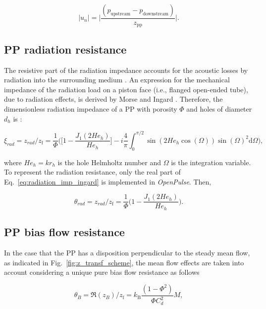 \documentclass[12pt]{article}
\begin{document}
\begin{equation} \label{eq:un-up-down}
	| u_n | = \Big| \frac{(p_{\text{upstream}}-p_{\text{downstream}})}{z_{\text{pp}}} \Big|.
\end{equation}

\subsection{\acrshort{PP} radiation resistance}

The resistive part of the radiation impedance accounts for the acoustic losses by radiation into the surrounding medium \cite{LAHIRI2017564}. An expression for the mechanical impedance of the radiation load on a piston face (i.e., flanged open-ended tube), due to radiation effects, is derived by Morse and Ingard \cite{morse1986theoretical}. Therefore, the dimensionless radiation impedance of a \acrshort{PP} with porosity $\Phi$ and holes of diameter $d_h$ is \cite{morse1986theoretical}:

\begin{equation} \label{eq:radiation_imp_ingard}
	\xi_{rad} = z_{rad}/ z_{\text{f}} =  \frac{1}{\Phi} \Big( \Big[ 1 - \frac{J_1(2 He_h)}{He_h} \Big] - i \frac{4}{\pi} \int_{0}^{\pi/2} \sin(2He_h \cos(\Omega)) \sin(\Omega)^2 \text{d}\Omega \Big),
\end{equation}

\noindent where $He_h = k r_h$ is the hole Helmholtz number and $\Omega$ is the integration variable. To represent the radiation resistance, only the real part of Eq.~\ref{eq:radiation_imp_ingard} is implemented in \textit{OpenPulse}. Then,

\begin{equation} \label{eq:radiation_imp}
 	\theta_{rad} = z_{rad}/ z_{\text{f}} =  \frac{1}{\Phi} \Big(  1 - \frac{J_1(2 He_h)}{He_h} \Big).
\end{equation}

\subsection{\acrshort{PP} bias flow resistance}

In the case that the \acrshort{PP} has a disposition perpendicular to the steady mean flow, as indicated in Fig.~\ref{fig:z_transf_scheme}, the mean flow effects are taken into account considering a unique pure bias flow resistance as follows 

\begin{equation} \label{eq:induct_pp_bias_flow}
	\theta_B = \mathfrak{R}(z_{B})/ z_{\text{f}} = k_\text{B} \frac{(1 - \Phi^2) }{ \Phi C_d^2  } M,
\end{equation}
\end{document}

